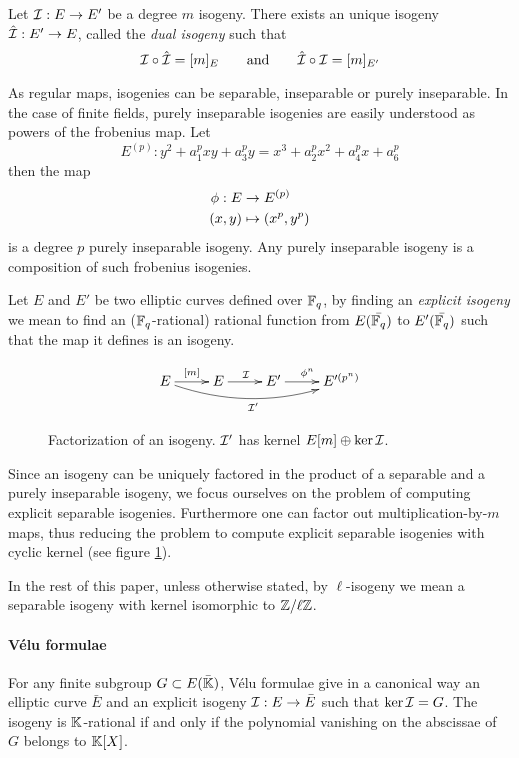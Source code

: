 \begin{definition}
  Let $\mathcal{I} : E \rightarrow E'$ be a degree $m$ isogeny. There exists an
  unique isogeny $\hat{\mathcal{I}} : E' \rightarrow E$, called the \emph{dual
    isogeny} such that
  \[\mathcal{I}\circ\hat{\mathcal{I}} = [m]_E \qquad\text{and}\qquad \hat{\mathcal{I}}\circ\mathcal{I} =
  [m]_{E'}\]
\end{definition}

As regular maps, isogenies can be separable, inseparable or purely
inseparable. In the case of finite fields, purely inseparable
isogenies are easily understood as powers of the frobenius map. Let
\[E^{(p)} : y^2 + a_1^pxy + a_3^py = x^3 + a_2^px^2 + a_4^px + a_6^p\]
then the map
\begin{align*}
  \phi : E &\rightarrow E^{(p)}\\
          (x,y) &\mapsto (x^p,y^p)
\end{align*}
is a degree $p$ purely inseparable isogeny. Any purely inseparable
isogeny is a composition of such frobenius isogenies.

Let $E$ and $E'$ be two elliptic curves defined over $\mathbb{F}_q$, by
finding an \emph{explicit isogeny} we mean to find an
($\mathbb{F}_q$-rational) rational function from $E(\bar{\mathbb{F}_q})$ to
$E'(\bar{\mathbb{F}_q})$ such that the map it defines is an isogeny.

\begin{figure}
  \centering
  \[\xymatrix{
    E \ar[r]^{[m]}\ar@/_1pc/[rrr]_{\I'} & E \ar[r]^\I & E' \ar[r]^{\frobisog^n} & E'^{(p^n)}\\
  }\]
  \label{fig:fact}
  \caption{Factorization of an isogeny. $\mathcal{I}'$ has kernel $E[m]\oplus\ker\mathcal{I}$.}
\end{figure}

Since an isogeny can be uniquely factored in the product of a
separable and a purely inseparable isogeny, we focus ourselves on the
problem of computing explicit separable isogenies. Furthermore one can
factor out multiplication-by-$m$ maps, thus reducing the problem to
compute explicit separable isogenies with cyclic kernel (see figure
\ref{fig:fact}).

In the rest of this paper, unless otherwise stated, by $\ell$-isogeny
we mean a separable isogeny with kernel isomorphic to $\mathbb{Z}/\ell\mathbb{Z}$.

\paragraph{Vélu formulae}
For any finite subgroup $G \subset E(\bar{\mathbb{K}})$, Vélu formulae
\cite{Vel71} give in a canonical way an elliptic curve $\bar{E}$ and
an explicit isogeny $\mathcal{I}:E\rightarrow \bar{E}$ such that
$\ker\mathcal{I}=G$. The isogeny is $\mathbb{K}$-rational if and only if the polynomial
vanishing on the abscissae of $G$ belongs to $\mathbb{K}[X]$.

